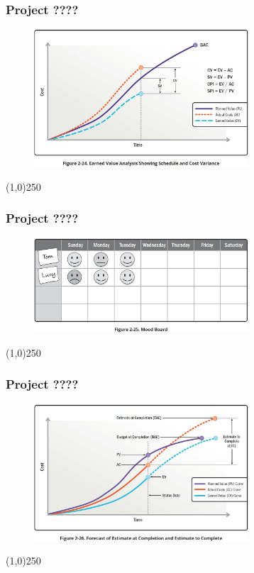 \begin{frame}
\frametitle{Project ????}
 \begin{figure}
    \centering
        \includegraphics[width = 8cm]{../images/guide/Fig2-24.jpg}
    \label{guidefig:2-24}
 \end{figure}
\end{frame}
\begin{center}\line(1,0){250}\end{center}

\begin{frame}
\frametitle{Project ????}
 \begin{figure}
    \centering
        \includegraphics[width = 8cm]{../images/guide/Fig2-25.jpg}
    \label{guidefig:2-25}
 \end{figure}
\end{frame}
\begin{center}\line(1,0){250}\end{center}

\begin{frame}
\frametitle{Project ????}
 \begin{figure}
    \centering
        \includegraphics[width = 8cm]{../images/guide/Fig2-26.jpg}
    \label{guidefig:2-26}
 \end{figure}
\end{frame}
\begin{center}\line(1,0){250}\end{center}

